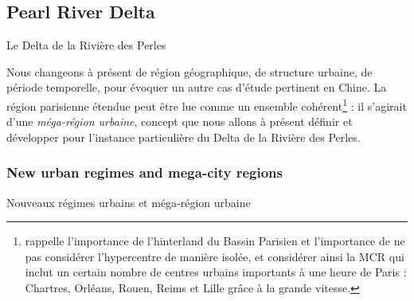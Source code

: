 \subsection{Pearl River Delta}{Le Delta de la Rivière des Perles}

Nous changeons à présent de région géographique, de structure urbaine, de période temporelle, pour évoquer un autre cas d'étude pertinent en Chine. La région parisienne étendue peut être lue comme un ensemble cohérent\footnote{\cite{gilli2005bassin} rappelle l'importance de l'hinterland du Bassin Parisien et l'importance de ne pas considérer l'hypercentre de manière isolée, et considérer ainsi la MCR qui inclut un certain nombre de centres urbains importants à une heure de Paris : Chartres, Orléans, Rouen, Reims et Lille grâce à la grande vitesse.} : il s'agirait d'une \emph{méga-région urbaine}, concept que nous allons à présent définir et développer pour l'instance particulière du Delta de la Rivière des Perles.




\subsubsection{New urban regimes and mega-city regions}{Nouveaux régimes urbains et méga-région urbaine}




